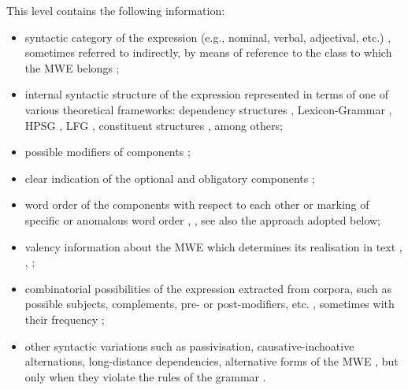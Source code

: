 \documentclass[output=paper,colorlinks,citecolor=brown]{langscibook}
\begin{document}
This level contains the following information:
         \begin{itemize}
            \item syntactic category of the expression (e.g., nominal, verbal, adjectival, etc.) \citep{shudo_etal_2011,al-hajetal2013,dyvik2019,markantonatou-etal-2019-idion}, sometimes referred to indirectly, by means of reference to the class to which the MWE belongs \citep{gregoire-2007,Odijk2013};  %
            \item internal syntactic structure of the expression \citep{dyvik2019,gregoire-2007,hnatkova-etal-2019,markantonatou-etal-2019-idion,markantonatou-etal-in-prep,shudo_etal_2011,przepiorkowski-etal-2014,villavicencio-LexicalEncoding,ECD} 
            represented in terms of one of various theoretical frameworks: dependency structures \citep{hnatkova-etal-2019,Odijk2013,villavicencio-LexicalEncoding,chapters/02,chapters/04,chapters/01}, Lexicon-Grammar \citep{gross-1982}, HPSG \citep{villavicencio-LexicalEncoding}, LFG \citep{dyvik2019}, constituent structures , among others;%
            \item possible modifiers of components \citep{fellbaum2005,markantonatou-etal-2019-idion,markantonatou-etal-in-prep,gregoire-2007,shudo_etal_2011,al-hajetal2013,chapters/02,chapters/04,chapters/01};
            \item clear indication of the optional and obligatory components \citep{fellbaum2005,markantonatou-etal-2019-idion,markantonatou-etal-in-prep,villavicencio-LexicalEncoding,chapters/02,chapters/01};
            \item word order of the components with respect to each other \citep{al-hajetal2013,markantonatou-etal-2019-idion,markantonatou-etal-in-prep,chapters/02} or marking of specific or anomalous word order , , see also the approach adopted below;
            \item valency information about the MWE which determines its realisation in text , , ;
            \item combinatorial possibilities of the expression extracted from corpora, such as possible subjects, complements, pre- or post-modifiers, etc. \citep{Odijk2013,ECD}, sometimes with their frequency \citep{Odijk2013,chapters/07};
            \item other syntactic variations such as passivisation, causative-inchoative alternations, long-distance dependencies, alternative forms of the MWE \citep{dyvik2019,fellbaum2005,markantonatou-etal-2019-idion,markantonatou-etal-in-prep, vietri,chapters/02,chapters/01}, but only when they violate the rules of the grammar \citep{ECD}. %
        \end{itemize}
\end{document}
